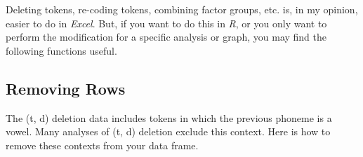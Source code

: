 \documentclass[
  12pt,
  letterpaper]{article}
\newenvironment{Shaded}{\begin{snugshade}}{\end{snugshade}}
\newcommand{\FunctionTok}[1]{\textcolor[rgb]{0.28,0.35,0.67}{#1}}
\newcommand{\NormalTok}[1]{\textcolor[rgb]{0.00,0.23,0.31}{#1}}
\newcommand{\OtherTok}[1]{\textcolor[rgb]{0.00,0.23,0.31}{#1}}
\newcommand{\SpecialCharTok}[1]{\textcolor[rgb]{0.37,0.37,0.37}{#1}}
\begin{document}
\begin{Shaded}
\end{Shaded}

Deleting tokens, re-coding tokens, combining factor groups, etc. is, in
my opinion, easier to do in \emph{Excel}. But, if you want to do this in
\emph{R}, or you only want to perform the modification for a specific
analysis or graph, you may find the following functions useful.

\hypertarget{removing-rows}{%
\subsection{Removing Rows}\label{removing-rows}}

The (t, d) deletion data includes tokens in which the previous phoneme
is a vowel. Many analyses of (t, d) deletion exclude this context. Here
is how to remove these contexts from your data frame.
\end{document}
